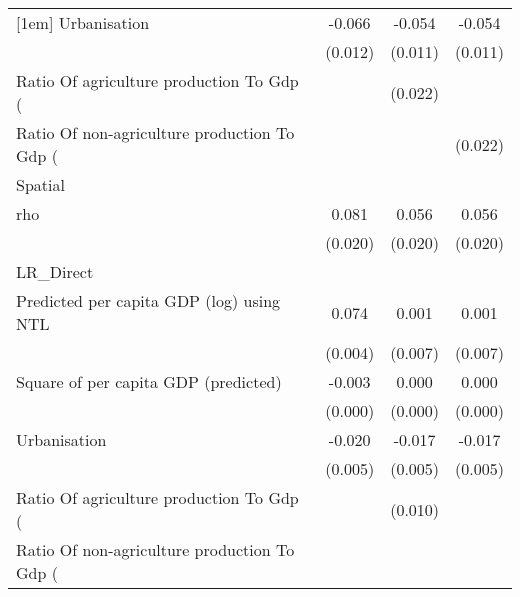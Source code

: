 {\begin{tabular}{l*{3}{c}}
[1em]
Urbanisation        &      -0.066\sym{***}&      -0.054\sym{***}&      -0.054\sym{***}\\
                    &     (0.012)         &     (0.011)         &     (0.011)         \\
[1em]
Ratio Of agriculture production To Gdp (%
                    &                     &     (0.022)         &                     \\
[1em]
Ratio Of non-agriculture production To Gdp (%
                    &                     &                     &     (0.022)         \\
\hline
Spatial             &                     &                     &                     \\
rho                 &       0.081\sym{***}&       0.056\sym{***}&       0.056\sym{***}\\
                    &     (0.020)         &     (0.020)         &     (0.020)         \\
\hline
LR\_Direct           &                     &                     &                     \\
Predicted per capita GDP (log) using NTL&       0.074\sym{***}&       0.001         &       0.001         \\
                    &     (0.004)         &     (0.007)         &     (0.007)         \\
[1em]
Square of per capita GDP (predicted)&      -0.003\sym{***}&       0.000         &       0.000         \\
                    &     (0.000)         &     (0.000)         &     (0.000)         \\
[1em]
Urbanisation        &      -0.020\sym{***}&      -0.017\sym{***}&      -0.017\sym{***}\\
                    &     (0.005)         &     (0.005)         &     (0.005)         \\
[1em]
Ratio Of agriculture production To Gdp (%
                    &                     &     (0.010)         &                     \\
[1em]
Ratio Of non-agriculture production To Gdp (%

\end{tabular}}
